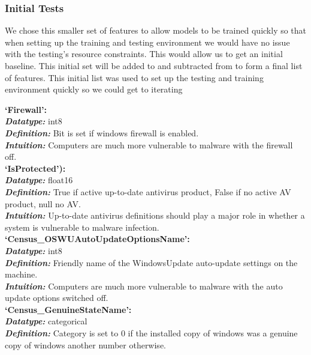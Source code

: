\documentclass[sigconf]{acmart}
\begin{document}
\subsubsection{Initial Tests}
We chose this smaller set of features to allow models to be trained quickly so that when setting up the training and testing environment we would have no issue with the testing's resource constraints. This would allow us to get an initial baseline. This initial set will be added to and subtracted from to form a final list of features. This initial list was used to set up the testing and training environment quickly so we could get to iterating
\begin{center}
\textbf{`Firewall':}\\
    \textbf{\textit{Datatype: }}int8\\
    \textbf{\textit{Definition: }}Bit is set if windows firewall is enabled. \\
    \textbf{\textit{Intuition: }}Computers are much more vulnerable to malware with the firewall off.\\
    \vspace{5mm}
    \textbf{`IsProtected'):\\}
    \textbf{\textit{Datatype: }}float16\\
    \textbf{\textit{Definition: }}True if active up-to-date antivirus product, False if no active AV product, null no AV. \\
    \textbf{\textit{Intuition: }}Up-to-date antivirus definitions should play a major role in whether a system is vulnerable to malware infection.\\
    \vspace{5mm}
    \textbf{`Census\_OSWUAutoUpdateOptionsName':\\}
    \textbf{\textit{Datatype: }}int8\\
    \textbf{\textit{Definition: }}Friendly name of the WindowsUpdate auto-update settings on the machine. \\
    \textbf{\textit{Intuition: }}Computers are much more vulnerable to malware with the auto update options switched off.\\
    \vspace{5mm}
    \textbf{`Census\_GenuineStateName':\\}
    \textbf{\textit{Datatype: }}categorical\\
    \textbf{\textit{Definition: }}Category is set to 0 if the installed copy of windows was a genuine copy of windows another number otherwise.\\

\end{center}
\end{document}
